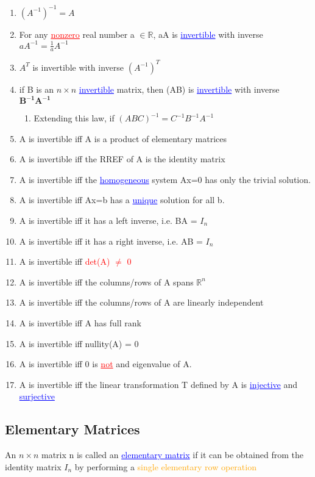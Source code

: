 \documentclass{article}
\newcommand{\bul}[1]{\textcolor{blue}{\underline{#1}}}
\newcommand{\rul}[1]{\textcolor{red}{\underline{#1}}}
\begin{document}
\begin{enumerate}
    \item $(A^{-1})^{-1} = A$
    \item For any \rul{nonzero} real number a $\in \mathbb{R}$, aA is \bul{invertible} with inverse \mbox{$aA^{-1} = \frac{1}{a}A^{-1}$}
    \item $A^T$ is invertible with inverse $(A^{-1})^T$
    \item if B is an $n\times n$ \bul{invertible} matrix, then (AB) is \bul{invertible} with inverse $\mathbf{B^{-1}A^{-1}}$
    \begin{enumerate}
        \item Extending this law, if $(ABC)^{-1} = C^{-1}B^{-1}A^{-1}$
    \end{enumerate}
    \item A is invertible iff A is a product of elementary matrices
    \item A is invertible iff the RREF of A is the identity matrix
    \item A is invertible iff the \bul{homogeneous} system Ax=0 has only the trivial solution.
    \item A is invertible iff Ax=b has a \bul{unique} solution for all b.
    \item A is invertible iff it has a left inverse, i.e. BA = $I_n$
    \item A is invertible iff it has a right inverse, i.e. AB = $I_n$
    \item A is invertible iff \textcolor{red}{det(A) $\neq$ 0}
    \item A is invertible iff the columns/rows of A spans $\mathbb{R}^n$
    \item A is invertible iff the columns/rows of A are linearly independent
    \item A is invertible iff A has full rank
    \item A is invertible iff nullity(A) = 0
    \item A is invertible iff 0 is \rul{not} and eigenvalue of A.
    \item A is invertible iff the linear transformation T defined by A is \bul{injective} and \bul{surjective}
\end{enumerate}

\subsection{Elementary Matrices}
An $n\times n$ matrix n is called an \bul{elementary matrix} if it can be obtained from the identity matrix $I_{n}$ by performing a \textcolor{orange}{single elementary row operation}
\end{document}
